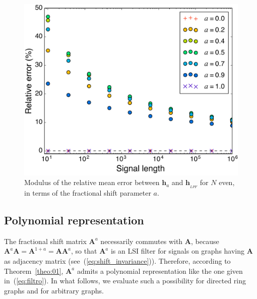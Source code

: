 \begin{figure}[ht!]
	\centering
	\includegraphics[width=0.81\linewidth]{Figures/convergence_even_N_abs_V2.pdf}
	\caption{Modulus of the relative mean error between $ \mathbf{h}_a $ and $ \mathbf{h}_{_{LPF}} $ for $ N $ even, in terms of the fractional shift parameter $a$.}
	\label{fig:convergence_even_N_abs}
	\vspace{-0.3cm}
\end{figure}

\subsection{Polynomial representation}\label{subsec:poly}
The fractional shift matrix $ \mathbf{A}^a$ necessarily commutes with $ \mathbf{A} $, because $ \mathbf{A}^a\mathbf{A} = \mathbf{A}^{1 + a} = \mathbf{A}\mathbf{A}^a  $, so that $ \mathbf{A}^a $ is an LSI filter for signals on graphs having  $ \mathbf{A} $ as adjacency matrix (see~(\ref{eq:shift_invariance})). Therefore, according to Theorem~\ref{theo:01}, $\mathbf{A}^a$ admits a polynomial representation like the one given in~(\ref{eq:filtro}). In what follows, we evaluate such a possibility for directed ring graphs and for arbitrary graphs.

